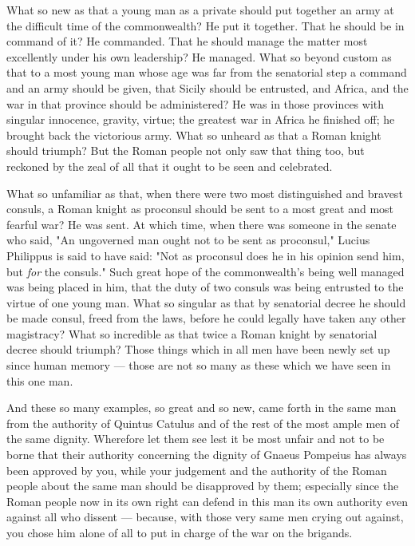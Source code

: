  What so new as that a young man as a private should put together an army at the difficult time of the commonwealth? He put it together. That he should be in command of it? He commanded. That he should manage the matter most excellently under his own leadership? He managed. What so beyond custom as that to a most young man whose age was far from the senatorial step a command and an army should be given, that Sicily should be entrusted, and Africa, and the war in that province should be administered? He was in those provinces with singular innocence, gravity, virtue; the greatest war in Africa he finished off; he brought back the victorious army. What so unheard as that a Roman knight should triumph? But the Roman people not only saw that thing too, but reckoned by the zeal of all that it ought to be seen and celebrated.

 What so unfamiliar as that, when there were two most distinguished and bravest consuls, a Roman knight as proconsul should be sent to a most great and most fearful war? He was sent. At which time, when there was someone in the senate who said, "An ungoverned man ought not to be sent as proconsul," Lucius Philippus is said to have said: "Not as proconsul does he in his opinion send him, but \textit{for} the consuls." Such great hope of the commonwealth's being well managed was being placed in him, that the duty of two consuls was being entrusted to the virtue of one young man. What so singular as that by senatorial decree he should be made consul, freed from the laws, before he could legally have taken any other magistracy? What so incredible as that twice a Roman knight by senatorial decree should triumph? Those things which in all men have been newly set up since human memory --- those are not so many as these which we have seen in this one man.

 And these so many examples, so great and so new, came forth in the same man from the authority of Quintus Catulus and of the rest of the most ample men of the same dignity. Wherefore let them see lest it be most unfair and not to be borne that their authority concerning the dignity of Gnaeus Pompeius has always been approved by you, while your judgement and the authority of the Roman people about the same man should be disapproved by them; especially since the Roman people now in its own right can defend in this man its own authority even against all who dissent --- because, with those very same men crying out against, you chose him alone of all to put in charge of the war on the brigands.

